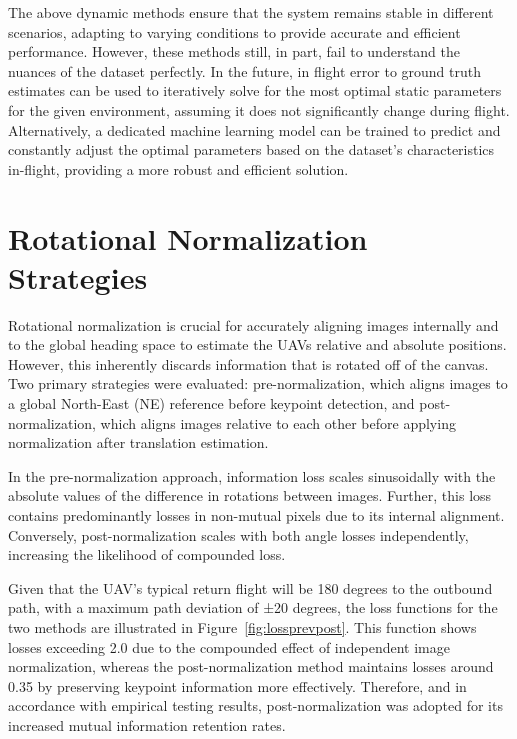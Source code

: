 The above dynamic methods ensure that the system remains stable in different scenarios, adapting to varying conditions to provide accurate and efficient performance. However, these methods still, in part, fail to understand the nuances of the dataset perfectly. In the future, in flight error to ground truth estimates can be used to iteratively solve for the most optimal static parameters for the given environment, assuming it does not significantly change during flight. Alternatively, a dedicated machine learning model can be trained to predict and constantly adjust the optimal parameters based on the dataset's characteristics in-flight, providing a more robust and efficient solution.


\section{Rotational Normalization Strategies}


Rotational normalization is crucial for accurately aligning images internally and to the global heading space to estimate the UAVs relative and absolute positions. However, this inherently discards information that is rotated off of the canvas. Two primary strategies were evaluated: pre-normalization, which aligns images to a global North-East (NE) reference before keypoint detection, and post-normalization, which aligns images relative to each other before applying normalization after translation estimation. 

In the pre-normalization approach, information loss scales sinusoidally with the absolute values of the difference in rotations between images. Further, this loss contains predominantly losses in non-mutual pixels due to its internal alignment. Conversely, post-normalization scales with both angle losses independently, increasing the likelihood of compounded loss. 

Given that the UAV's typical return flight will be 180 degrees to the outbound path, with a maximum path deviation of ±20 degrees, the loss functions for the two methods are illustrated in Figure~\ref{fig:lossprevpost}. This function shows losses exceeding 2.0 due to the compounded effect of independent image normalization, whereas the post-normalization method maintains losses around 0.35 by preserving keypoint information more effectively. 
Therefore, and in accordance with empirical testing results, post-normalization was adopted for its increased mutual information retention rates.

